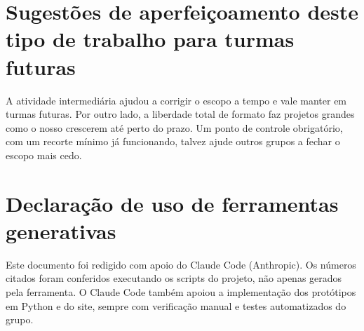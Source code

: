 \documentclass[11pt]{article}
\begin{document}
\section{Sugestões de aperfeiçoamento deste tipo de trabalho para turmas futuras}

A atividade intermediária ajudou a corrigir o escopo a tempo e vale manter em turmas
futuras. Por outro lado, a liberdade total de formato faz projetos grandes como o nosso
crescerem até perto do prazo. Um ponto de controle obrigatório, com um recorte mínimo já
funcionando, talvez ajude outros grupos a fechar o escopo mais cedo.

\section*{Declaração de uso de ferramentas generativas}

Este documento foi redigido com apoio do Claude Code (Anthropic). Os números citados foram
conferidos executando os scripts do projeto, não apenas gerados pela ferramenta. O Claude
Code também apoiou a implementação dos protótipos em Python e do site, sempre com
verificação manual e testes automatizados do grupo.

\clearpage
\printbibliography[title={Referências}]
\end{document}
